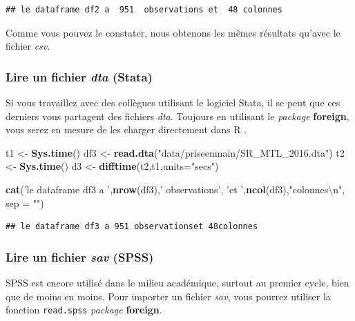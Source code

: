 \documentclass[
  11pt,
  french,
]{book}
\makeatletter
\newenvironment{Shaded}{\begin{snugshade}}{\end{snugshade}}
\newcommand{\CharTok}[1]{\textcolor[rgb]{0.31,0.60,0.02}{#1}}
\newcommand{\DataTypeTok}[1]{\textcolor[rgb]{0.13,0.29,0.53}{#1}}
\newcommand{\KeywordTok}[1]{\textcolor[rgb]{0.13,0.29,0.53}{\textbf{#1}}}
\newcommand{\NormalTok}[1]{#1}
\newcommand{\StringTok}[1]{\textcolor[rgb]{0.31,0.60,0.02}{#1}}
\newenvironment{kframe}{%
\medskip{}
\setlength{\fboxsep}{.8em}
 \def\at@end@of@kframe{}%
 \ifinner\ifhmode%
  \def\at@end@of@kframe{\end{minipage}}%
  \begin{minipage}{\columnwidth}%
 \fi\fi%
 \def\FrameCommand##1{\hskip\@totalleftmargin \hskip-\fboxsep
 \colorbox{shadecolor}{##1}\hskip-\fboxsep
     \hskip-\linewidth \hskip-\@totalleftmargin \hskip\columnwidth}%
 \MakeFramed {\advance\hsize-\width
   \@totalleftmargin\z@ \linewidth\hsize
   \@setminipage}}%
 {\par\unskip\endMakeFramed%
 \at@end@of@kframe}
\renewenvironment{Shaded}{\begin{kframe}}{\end{kframe}}
\makeatother
\begin{document}
\begin{verbatim}
## le dataframe df2 a  951  observations et  48 colonnes
\end{verbatim}

Comme vous pouvez le constater, nous obtenons les mêmes résultats qu'avec le fichier \emph{csv}.

\hypertarget{sect01413}{%
\subsubsection{\texorpdfstring{Lire un fichier \emph{dta} (Stata)}{Lire un fichier dta (Stata)}}\label{sect01413}}

Si vous travaillez avec des collègues utilisant le logiciel Stata, il se peut que ces derniers vous partagent des fichiers \emph{dta}. Toujours en utilisant le \emph{package} \textbf{foreign}, vous serez en mesure de les charger directement dans R .

\begin{Shaded}
\begin{Highlighting}[]
\NormalTok{t1 <-}\StringTok{ }\KeywordTok{Sys.time}\NormalTok{()}
\NormalTok{df3 <-}\StringTok{ }\KeywordTok{read.dta}\NormalTok{(}\StringTok{"data/priseenmain/SR_MTL_2016.dta"}\NormalTok{)}
\NormalTok{t2 <-}\StringTok{ }\KeywordTok{Sys.time}\NormalTok{()}
\NormalTok{d3 <-}\StringTok{ }\KeywordTok{difftime}\NormalTok{(t2,t1,}\DataTypeTok{units=}\StringTok{"secs"}\NormalTok{)}

\KeywordTok{cat}\NormalTok{(}\StringTok{'le dataframe df3 a '}\NormalTok{,}\KeywordTok{nrow}\NormalTok{(df3),}\StringTok{' observations'}\NormalTok{,}
    \StringTok{'et '}\NormalTok{,}\KeywordTok{ncol}\NormalTok{(df3),}\StringTok{"colonnes}\CharTok{\textbackslash{}n}\StringTok{"}\NormalTok{, }\DataTypeTok{sep =} \StringTok{""}\NormalTok{)}
\end{Highlighting}
\end{Shaded}

\begin{verbatim}
## le dataframe df3 a 951 observationset 48colonnes
\end{verbatim}

\hypertarget{sect01414}{%
\subsubsection{\texorpdfstring{Lire un fichier \emph{sav} (SPSS)}{Lire un fichier sav (SPSS)}}\label{sect01414}}

SPSS est encore utilisé dans le milieu académique, surtout au premier cycle, bien que de moins en moins. Pour importer un fichier \emph{sav}, vous pourrez utiliser la fonction \texttt{read.spss} \emph{package} \textbf{foreign}.
\end{document}
